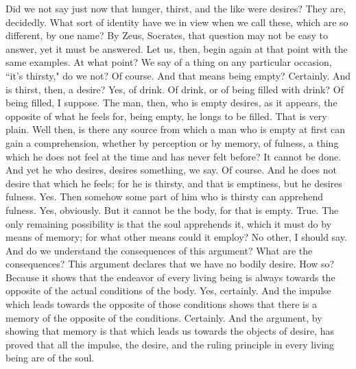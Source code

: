 \documentclass[letterpaper,12pt]{article}
\newcommand{\stephpag}[1]{\marginnote{\small\itshape\fontfamily{ppl}\selectfont #1}}
\begin{document}
\begin{drama}
\socratesspeaks
Did we not say just now that hunger, thirst, \stephpag{e} and the like were desires?
\protarchusspeaks
They are, decidedly.
\socratesspeaks
What sort of identity have we in view when we call these, which are so different, by one name?
\protarchusspeaks
By Zeus, Socrates, that question may not be easy to answer, yet it must be answered.
\socratesspeaks
Let us, then, begin again at that point with the same examples.
\protarchusspeaks
At what point?
\socratesspeaks
We say of a thing on any particular occasion, ``it's thirsty," do we not?
\protarchusspeaks
Of course.
\socratesspeaks
And that means being empty?
\protarchusspeaks
Certainly.
\socratesspeaks
And is thirst, then, a desire?
\protarchusspeaks
Yes, of drink. \stephpag{35 a}
\socratesspeaks
Of drink, or of being filled with drink?
\protarchusspeaks
Of being filled, I suppose.
\socratesspeaks
The man, then, who is empty desires, as it appears, the opposite of what he feels for, being empty, he longs to be filled.
\protarchusspeaks
That is very plain.
\socratesspeaks
Well then, is there any source from which a man who is empty at first can gain a comprehension, whether by perception or by memory, of fulness, a thing which he does not feel at the time and has never felt before?
\protarchusspeaks
It cannot be done. \stephpag{b}
\socratesspeaks
And yet he who desires, desires something, we say.
\protarchusspeaks
Of course.
\socratesspeaks
And he does not desire that which he feels; for he is thirsty, and that is emptiness, but he desires fulness.
\protarchusspeaks
Yes.
\socratesspeaks
Then somehow some part of him who is thirsty can apprehend fulness.
\protarchusspeaks
Yes, obviously.
\socratesspeaks
But it cannot be the body, for that is empty.
\protarchusspeaks
True.
\socratesspeaks
The only remaining possibility is that the soul apprehends it, \stephpag{c} which it must do by means of memory; for what other means could it employ?
\protarchusspeaks
No other, I should say.
\socratesspeaks
And do we understand the consequences of this argument?
\protarchusspeaks
What are the consequences?
\socratesspeaks
This argument declares that we have no bodily desire.
\protarchusspeaks
How so?
\socratesspeaks
Because it shows that the endeavor of every living being is always towards the opposite of the actual conditions of the body.
\protarchusspeaks
Yes, certainly.
\socratesspeaks
And the impulse which leads towards the opposite of those conditions shows that there is a memory of the opposite of the conditions.
\protarchusspeaks
Certainly. \stephpag{d}
\socratesspeaks
And the argument, by showing that memory is that which leads us towards the objects of desire, has proved that all the impulse, the desire, and the ruling principle in every living being are of the soul.

\end{drama}
\end{document}
